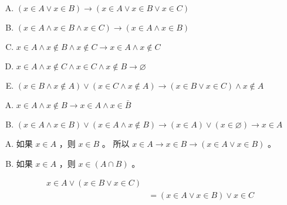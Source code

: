 {{        %
        \begin{practices}
            \begin{enumerate}[A.]
                \item $(x \in A \vee x \in B) \rightarrow (x \in A \vee x \in B \vee x \in C)$
                \item $(x \in A \wedge x \in B \wedge x \in C) \rightarrow (x \in A \wedge x \in B)$
                \item $x \in A \wedge x \notin B \wedge x \notin C \rightarrow x \in A \wedge x \notin C$
                \item $x \in A \wedge x \notin C \wedge x \in C \wedge x \notin B \rightarrow \varnothing$
                \item $(x \in B \wedge x \notin A) \vee (x \in C \wedge x \notin A) \rightarrow (x \in B \vee x \in C) \wedge x \notin A$
            \end{enumerate}
        \end{practices}

        \begin{practices}
            \begin{enumerate}[A.]
                \item $x \in A \wedge x \notin B \rightarrow x \in A \wedge x \in \bar{B}$
                \item $(x \in A \wedge x \in B) \vee (x \in A \wedge x \notin B) \rightarrow (x \in A) \vee (x \in \varnothing) \rightarrow x \in A$
            \end{enumerate}
        \end{practices}

        \begin{practices}
            \begin{enumerate}[A.]
                \item
                {
                    如果 $x \in A$ ，则 $x \in B$ 。
                    所以 $x \in A \rightarrow x \in B \rightarrow (x \in A \vee x \in B)$ 。
                }
                \item
                {
                    如果 $x \in A$ ，则 $x \in (A \cap B)$ 。
                }
            \end{enumerate}
        \end{practices}

        \begin{practices}
            \begin{align*}
                x \in A \vee (x \in B \vee x \in C) \\
                &= (x \in A \vee x \in B) \vee x \in C
            \end{align*}
        \end{practices}

}}
